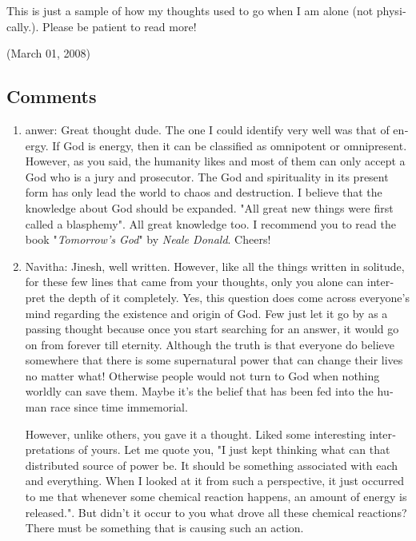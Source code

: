 \begin{english}
This is just a sample of how my thoughts used to go when I am alone (not physically.). Please be patient to read more!

\begin{flushright}(March 01, 2008)\end{flushright}

\subsection*{Comments}
\begin{enumerate}
\item{anwer: }
Great thought dude. The one I could identify very well was that of energy. If God is energy, then it can be classified as omnipotent or omnipresent. However, as you said, the humanity likes and most of them can only accept a God who is a jury and prosecutor. The God and spirituality in its present form has only lead the world to chaos and destruction. I believe that the knowledge about God should be expanded. "All great new things were first called a blasphemy". All great knowledge too. I recommend you to read the book "\emph{Tomorrow's God}" by \emph{Neale Donald}. Cheers!

\item{Navitha: }
Jinesh, well written. However, like all the things written in solitude, for these few lines that came from your thoughts, only you alone can interpret the depth of it completely. Yes, this question does come across everyone's mind regarding the existence and origin of God. Few just let it go by as a passing thought because once you start searching for an answer, it would go on from forever till eternity. Although the truth is that everyone do believe somewhere that there is some supernatural power that can change their lives no matter what! Otherwise people would not turn to God when nothing worldly can save them. Maybe it's the belief that has been fed into the human race since time immemorial.

However, unlike others, you gave it a thought. Liked some interesting interpretations of yours.
Let me quote you, "I just kept thinking what can that distributed source of power be. It should be something associated with each and everything. When I looked at it from such a perspective, it just occurred to me that whenever some chemical reaction happens, an amount of energy is released.". But didn't it occur to you what drove all these chemical reactions? There must be something that is causing such an action.


\end{enumerate}
\end{english}

